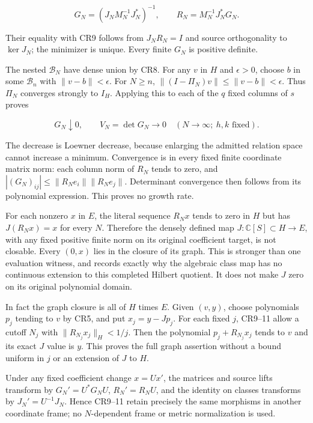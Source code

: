\documentclass{article}
\begin{document}
\[
G_N=(J_NM_N^{-1}J_N^*)^{-1},\qquad
R_N=M_N^{-1}J_N^*G_N.
\tag{CR10}
\]

Their equality with CR9 follows from \(J_NR_N=I\) and source orthogonality to \(\ker J_N\); the minimizer is unique. Every finite \(G_N\) is positive definite.

The nested \(\mathcal B_N\) have dense union by CR8. For any \(v\) in \(H\) and \(\epsilon>0\), choose \(b\) in some \(\mathcal B_n\) with \(\|v-b\|<\epsilon\). For \(N\ge n\), \(\|(I-\Pi_N)v\|\le\|v-b\|<\epsilon\). Thus \(\Pi_N\) converges strongly to \(I_H\). Applying this to each of the \(q\) fixed columns of \(s\) proves

\[
\boxed{G_N\downarrow0,\qquad V_N=\det G_N\longrightarrow0
\quad(N\longrightarrow\infty;\ h,k\text{ fixed}).}
\tag{CR11}
\]

The decrease is Loewner decrease, because enlarging the admitted relation space cannot increase a minimum. Convergence is in every fixed finite coordinate matrix norm: each column norm of \(R_N\) tends to zero, and \(|(G_N)_{ij}|\le\|R_Ne_i\|\|R_Ne_j\|\). Determinant convergence then follows from its polynomial expression. This proves no growth rate.

For each nonzero \(x\) in \(E\), the literal sequence \(R_Nx\) tends to zero in \(H\) but has \(J(R_Nx)=x\) for every \(N\). Therefore the densely defined map \(J:\mathbb C[S]\subset H\to E\), with any fixed positive finite norm on its original coefficient target, is not closable. Every \((0,x)\) lies in the closure of its graph. This is stronger than one evaluation witness, and records exactly why the algebraic class map has no continuous extension to this completed Hilbert quotient. It does not make \(J\) zero on its original polynomial domain.

In fact the graph closure is all of \(H\) times \(E\). Given \((v,y)\), choose polynomials \(p_j\) tending to \(v\) by CR5, and put \(x_j=y-Jp_j\). For each fixed \(j\), CR9--11 allow a cutoff \(N_j\) with \(\|R_{N_j}x_j\|_H<1/j\). Then the polynomial \(p_j+R_{N_j}x_j\) tends to \(v\) and its exact \(J\) value is \(y\). This proves the full graph assertion without a bound uniform in \(j\) or an extension of \(J\) to \(H\).

Under any fixed coefficient change \(x=Ux'\), the matrices and source lifts transform by \(G_N'=U^*G_NU\), \(R_N'=R_NU\), and the identity on classes transforms by \(J_N'=U^{-1}J_N\). Hence CR9--11 retain precisely the same morphisms in another coordinate frame; no \(N\)-dependent frame or metric normalization is used.
\end{document}
